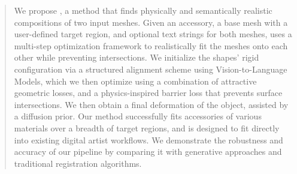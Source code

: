 \begin{abstract}
We propose \ourmethod{}, a method that finds physically and semantically realistic compositions of two input meshes. Given an accessory, a base mesh with a user-defined target region, and optional text strings for both meshes, \ourmethod{} uses a multi-step optimization framework to realistically fit the meshes onto each other while preventing intersections.
We initialize the shapes' rigid configuration via a structured alignment scheme using Vision-to-Language Models, which we then optimize using a combination of attractive geometric losses, and a physics-inspired barrier loss that prevents surface intersections. 
We then obtain a final deformation of the object, assisted by a diffusion prior.
Our method successfully fits accessories of various materials over a breadth of target regions, and is designed to fit directly into existing digital artist workflows. We demonstrate the robustness and accuracy of our pipeline by comparing it with generative approaches and traditional registration algorithms.
\end{abstract}
